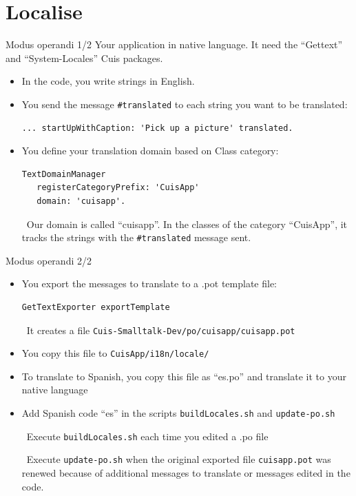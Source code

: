 \documentclass{beamer}
\newcommand{\tip}{\boldmath{\textcolor{red}{$\Rightarrow$}}}
\begin{document}
\section{Localise}
\begin{frame}[fragile]{ Modus operandi 1/2}
\fontsize{10pt}{8pt}\selectfont
  Your application in native language. It need the ``Gettext'' and
  ``System-Locales'' Cuis packages.
  \begin{itemize}
  \item In the code, you write strings in English. 
  \item You send the message \texttt{\#translated} to each string you
    want to be translated:
    \begin{lstlisting}[language=Smalltalk]
... startUpWithCaption: 'Pick up a picture' translated.
    \end{lstlisting}
  \item You define your translation domain based on Class category:
    \begin{lstlisting}[language=Smalltalk]
TextDomainManager
   registerCategoryPrefix: 'CuisApp'
   domain: 'cuisapp'.
 \end{lstlisting}
 \tip\ Our domain is called ``cuisapp''. In the classes of the
 category ``CuisApp'', it tracks the strings with the
 \texttt{\#translated} message sent.
 
\end{itemize}
\end{frame}
%
\begin{frame}[fragile]{ Modus operandi 2/2}
  \begin{itemize}
  \item You export the messages to translate to a .pot template file:
    \begin{lstlisting}[language=Smalltalk]
GetTextExporter exportTemplate
\end{lstlisting}
\tip\ It creates a file \texttt{Cuis-Smalltalk-Dev/po/cuisapp/cuisapp.pot}
\item You copy this file to \texttt{CuisApp/i18n/locale/}
\item To translate to Spanish, you copy this file as ``es.po'' and
  translate it to your native language
\item Add Spanish code ``es'' in the scripts \texttt{buildLocales.sh}
  and \texttt{update-po.sh}
  
  \tip\ Execute \texttt{buildLocales.sh} each time you edited a .po
  file

  \tip\ Execute \texttt{update-po.sh} when the original exported file
  \texttt{cuisapp.pot} was renewed because of additional messages to
  translate or messages edited in the code.
  \end{itemize}
\end{frame}
\end{document}
